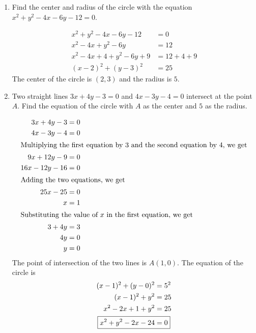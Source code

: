 \BgThispage
\begin{enumerate}
    \item Find the center and radius of the circle with the equation \( x^2 + y^2 - 4x - 6y - 12 = 0 \).
    \begin{solution}
        \begin{align*}
            x^2 + y^2 - 4x - 6y - 12 &= 0 \\
            x^2 - 4x + y^2 - 6y &= 12 \\
            x^2 - 4x + 4 + y^2 - 6y + 9 &= 12 + 4 + 9 \\
            (x - 2)^2 + (y - 3)^2 &= 25
        \end{align*}
        The center of the circle is \( (2, 3) \) and the radius is \( 5 \).
    \end{solution}

    \item Two straight lines \( 3x + 4y - 3 = 0 \) and \( 4x - 3y - 4 = 0 \) intersect at the point \( A \). Find the equation of the circle with \( A \) as the center and \( 5 \) as the radius.
    \begin{solution}
        \begin{align*}
            3x + 4y - 3 &= 0 \\
            4x - 3y - 4 &= 0 \\
            \intertext{Multiplying the first equation by 3 and the second equation by 4, we get}
            9x + 12y - 9 &= 0 \\
            16x - 12y - 16 &= 0 \\
            \intertext{Adding the two equations, we get}
            25x - 25 &= 0 \\
            x &= 1 \\
            \intertext{Substituting the value of \( x \) in the first equation, we get}
            3 + 4y &= 3 \\
            4y &= 0 \\
            y &= 0
        \end{align*}
        The point of intersection of the two lines is \( A(1, 0) \). The equation of the circle is
        \begin{align*}
            (x - 1)^2 + (y - 0)^2 &= 5^2 \\
            (x - 1)^2 + y^2 &= 25 \\
            x^2 - 2x + 1 + y^2 &= 25 \\
            \Aboxed{x^2 + y^2 - 2x - 24 &= 0}
        \end{align*}
    \end{solution}
\end{enumerate}